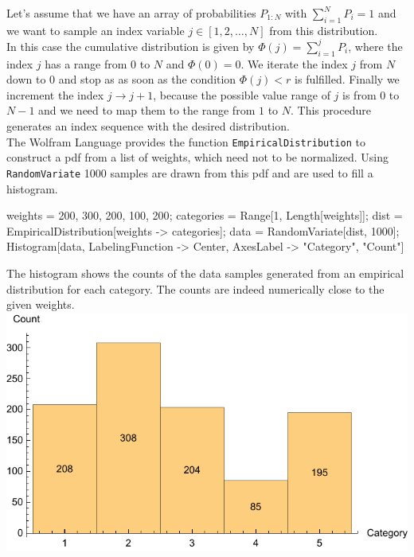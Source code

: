 \documentclass{tstextbook}
\begin{document}
\begin{example}
Let's assume that we have an array of probabilities $P_{1:N}$ with $\sum_{i=1}^{N}P_i=1$ and we want to sample an index variable $j\in [1,2,\ldots,N]$ from this distribution.\\

In this case the cumulative distribution is given by $\Phi(j)=\sum_{i=1}^{j}P_i$, where the index $j$ has a range from $0$ to $N$ and $\Phi(0)=0$.
We iterate the index $j$ from $N$ down to $0$ and stop as as soon as the condition $\Phi(j) < r$ is fulfilled. Finally we increment the index $j\rightarrow j+1$, because the possible value range of $j$ is from $0$ to $N-1$ and we need to map them to the range from $1$ to $N$. This procedure generates an index sequence with the desired distribution.\\

The Wolfram Language provides the function \texttt{EmpiricalDistribution} to construct a pdf from a list of weights, which need not to be normalized. Using \texttt{RandomVariate} 1000 samples are drawn from this pdf and are used to fill a histogram.
 
\begin{mathematica}
weights = {200, 300, 200, 100, 200};
categories = Range[1, Length[weights]];
dist = EmpiricalDistribution[weights -> categories];
data = RandomVariate[dist, 1000];
Histogram[data,
          LabelingFunction -> Center,
          AxesLabel -> {"Category", "Count"}]
\end{mathematica}

The histogram shows the counts of the data samples generated from an empirical distribution for each category. The counts are indeed numerically close to the given weights.\\

 \includegraphics[scale=1, center]{images/sampling_from_discrete_distribution.pdf}   
\end{example}
\end{document}
